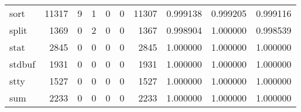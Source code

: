 \begin{tabular}{lrrrrrrrrr}
sort      &                                              11317 &                                                  9 &                                                  1 &                                                  0 &                                                  0 &                                              11307 &                                           0.999138 &                               0.999205 &                             0.999116 \\
split     &                                               1369 &                                                  0 &                                                  2 &                                                  0 &                                                  0 &                                               1367 &                                           0.998904 &                               1.000000 &                             0.998539 \\
stat      &                                               2845 &                                                  0 &                                                  0 &                                                  0 &                                                  0 &                                               2845 &                                           1.000000 &                               1.000000 &                             1.000000 \\
stdbuf    &                                               1931 &                                                  0 &                                                  0 &                                                  0 &                                                  0 &                                               1931 &                                           1.000000 &                               1.000000 &                             1.000000 \\
stty      &                                               1527 &                                                  0 &                                                  0 &                                                  0 &                                                  0 &                                               1527 &                                           1.000000 &                               1.000000 &                             1.000000 \\
sum       &                                               2233 &                                                  0 &                                                  0 &                                                  0 &                                                  0 &                                               2233 &                                           1.000000 &                               1.000000 &                             1.000000 \\

\end{tabular}
